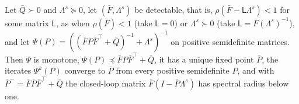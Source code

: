 \begin{lemma}\label{lem:met-riccati}
Let $\bar Q\succ0$ and $\Lambda^s\succeq0$, let $(\bar F,\Lambda^s)$ be detectable, that is, $\rho(\bar F-\mathsf L\Lambda^s)<1$ for some matrix $\mathsf L$, as when $\rho(\bar F)<1$ (take $\mathsf L=0$) or $\Lambda^s\succ0$ (take $\mathsf L=\bar F(\Lambda^s)^{-1}$), and let $\Psi(P)=((\bar FP\bar F^\top+\bar Q)^{-1}+\Lambda^s)^{-1}$ on positive semidefinite matrices. Then $\Psi$ is monotone, $\Psi(P)\preceq\bar FP\bar F^\top+\bar Q$, it has a unique fixed point $\bar P$, the iterates $\Psi^k(P)$ converge to $\bar P$ from every positive semidefinite $P$, and with $\bar P^-=\bar F\bar P\bar F^\top+\bar Q$ the closed-loop matrix $\bar F(I-\bar P\Lambda^s)$ has spectral radius below one.
\end{lemma}

